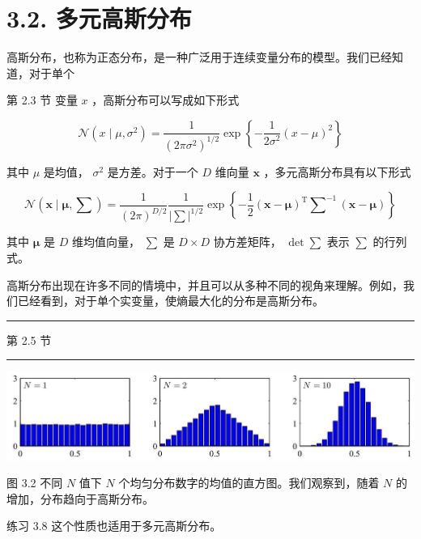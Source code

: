\documentclass[10pt]{report}
\newcommand{\HRule}{\begin{center}\rule{0.9\linewidth}{0.2mm}\end{center}}
\begin{document}
\section*{3.2. 多元高斯分布}

高斯分布，也称为正态分布，是一种广泛用于连续变量分布的模型。我们已经知道，对于单个

第 2.3 节 变量 \(x\) ，高斯分布可以写成如下形式

\[
\mathcal{N}\left( {x \mid  \mu ,{\sigma }^{2}}\right)  = \frac{1}{{\left( 2\pi {\sigma }^{2}\right) }^{1/2}}\exp \left\{  {-\frac{1}{2{\sigma }^{2}}{\left( x - \mu \right) }^{2}}\right\}   \tag{3.25}
\]

其中 \(\mu\) 是均值， \({\sigma }^{2}\) 是方差。对于一个 \(D\) 维向量 \(\mathbf{x}\) ，多元高斯分布具有以下形式

\[
\mathcal{N}\left( {\mathbf{x} \mid  \mathbf{\mu },\mathbf{\sum }}\right)  = \frac{1}{{\left( 2\pi \right) }^{D/2}}\frac{1}{{\left| \mathbf{\sum }\right| }^{1/2}}\exp \left\{  {-\frac{1}{2}{\left( \mathbf{x} - \mathbf{\mu }\right) }^{\mathrm{T}}{\mathbf{\sum }}^{-1}\left( {\mathbf{x} - \mathbf{\mu }}\right) }\right\}   \tag{3.26}
\]

其中 \(\mathbf{\mu }\) 是 \(D\) 维均值向量， \(\mathbf{\sum }\) 是 \(D \times  D\) 协方差矩阵， \(\det \mathbf{\sum }\) 表示 \(\mathbf{\sum }\) 的行列式。

高斯分布出现在许多不同的情境中，并且可以从多种不同的视角来理解。例如，我们已经看到，对于单个实变量，使熵最大化的分布是高斯分布。

\HRule

第 2.5 节

\HRule

\begin{center}
\includegraphics[max width=1.0\textwidth]{images/0194e279-9b28-703a-88f4-c3ac21e2010d_90_224_358_1299_282_0.jpg}
\end{center}
\hspace*{3em} 

图 3.2 不同 \(N\) 值下 \(N\) 个均匀分布数字的均值的直方图。我们观察到，随着 \(N\) 的增加，分布趋向于高斯分布。

练习 3.8 这个性质也适用于多元高斯分布。
\end{document}
